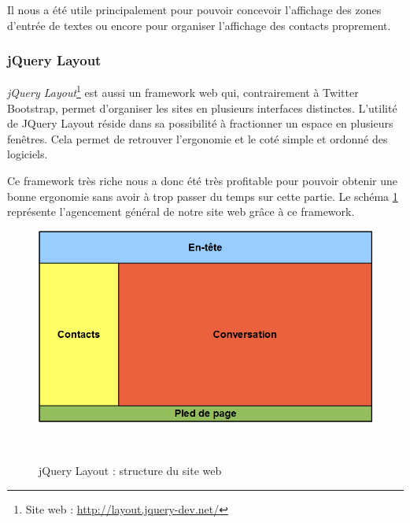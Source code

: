 Il nous a été utile principalement pour pouvoir concevoir l'affichage des zones d'entrée de textes ou 
encore pour organiser l'affichage des contacts proprement.
\\


\subsubsection{jQuery Layout}

\textit{jQuery Layout}\footnote{Site web : \href{http://layout.jquery-dev.net/}{http://layout.jquery-dev.net/}} est aussi un framework web qui, contrairement à Twitter Bootstrap, permet d'organiser les sites en plusieurs interfaces distinctes. 
L'utilité de JQuery Layout réside dans sa possibilité à fractionner un espace en plusieurs fenêtres.
Cela permet de retrouver l'ergonomie et le coté simple et ordonné des logiciels. 

Ce framework très riche nous a donc été très profitable pour pouvoir obtenir une bonne ergonomie sans avoir
à trop passer du temps sur cette partie.
Le schéma \ref{siteWeb_jQueryLayout} représente l'agencement général de notre site web grâce à ce framework.

\begin{figure}[!h]
	\center
	\includegraphics[width=13cm]{img/siteWeb_jQueryLayout.png}
	\caption{jQuery Layout : structure du site web}
	\label{siteWeb_jQueryLayout}
~~\\
\end{figure}




